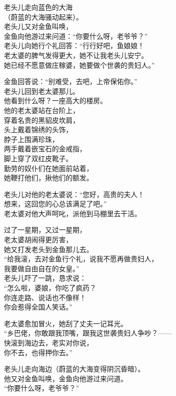 \documentclass[]{book}
\renewenvironment{quote}{\begin{VF}}{\end{VF}}
\begin{document}
\begin{quote}
老头儿走向蓝色的大海\\
（蔚蓝的大海骚动起来）。\\
老头儿又对金鱼叫唤，\\
金鱼向他游过来问道：``你要什么呀，老爷爷？''\\
老头儿向她行个礼回答：``行行好吧，鱼娘娘！\\
老太婆的脾气发得更大，她不让我老头儿安宁。\\
她已经不愿意做庄稼婆，她要做个世袭的贵妇人。''

金鱼回答说：``别难受，去吧，上帝保佑你。''\\
老头儿回到老太婆那儿。\\
他看到什么呀？一座高大的楼房。\\
他的老太婆站在台阶上，\\
穿着名贵的黑貂皮坎肩，\\
头上戴着锦绣的头饰，\\
脖子上围满珍珠，\\
两手戴着嵌宝石的金戒指，\\
脚上穿了双红皮靴子。\\
勤劳的奴仆们在她面前站着，\\
她鞭打他们，揪他们的额发。

老头儿对他的老太婆说：``您好，高贵的夫人！\\
想来，这回您的心总该满足了吧。''\\
老太婆对他大声呵叱，派他到马棚里去干活。

过了一星期，又过一星期，\\
老太婆胡闹得更厉害，\\
她又打发老头到金鱼那儿去。\\
``给我滚，去对金鱼行个礼，说我不愿再做贵妇人，\\
我要做自由自在的女皇。''\\
老头儿吓了一跳，恳求说：\\
``怎么啦，婆娘，你吃了疯药？\\
你连走路、说话也不像样！\\
你会惹得全国人笑话。''

老太婆愈加冒火，她刮了丈夫一记耳光。\\
``乡巴佬，你敢跟我顶嘴，跟我这世袭贵妇人争吵？------\\
快滚到海边去，老实对你说，\\
你不去，也得押你去。''

老头儿走向海边（蔚蓝的大海变得阴沉昏暗）。\\
他又对金鱼叫唤，金鱼向他游过来问道。\\
``你要什么呀，老爷爷？''


\end{quote}
\end{document}
